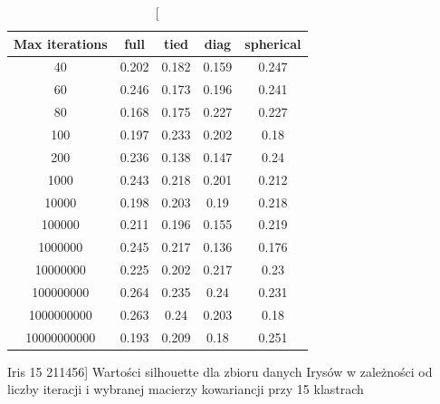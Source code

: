 \documentclass{classrep}
\begin{document}
{{            \begin{table}[!htbp]
                \begin{minipage}{1\textwidth}
                \centering
                \begin{tabular}{|c|c|c|c|c|}
                \hline
                Max iterations & full & tied & diag & spherical \\ \hline
                40 & 0.202 & 0.182 & 0.159 & 0.247 \\ \hline
                60 & 0.246 & 0.173 & 0.196 & 0.241 \\ \hline
                80 & 0.168 & 0.175 & 0.227 & 0.227 \\ \hline
                100 & 0.197 & 0.233 & 0.202 & 0.18 \\ \hline
                200 & 0.236 & 0.138 & 0.147 & 0.24 \\ \hline
                1000 & 0.243 & 0.218 & 0.201 & 0.212 \\ \hline
                10000 & 0.198 & 0.203 & 0.19 & 0.218 \\ \hline
                100000 & 0.211 & 0.196 & 0.155 & 0.219 \\ \hline
                1000000 & 0.245 & 0.217 & 0.136 & 0.176 \\ \hline
                10000000 & 0.225 & 0.202 & 0.217 & 0.23 \\ \hline
                100000000 & 0.264 & 0.235 & 0.24 & 0.231 \\ \hline
                1000000000 & 0.263 & 0.24 & 0.203 & 0.18 \\ \hline
                10000000000 & 0.193 & 0.209 & 0.18 & 0.251 \\ \hline
                \end{tabular}
                \caption
                [Iris 15 211456]
                {Wartości silhouette dla zbioru danych Irysów w zależności od liczby
                iteracji i wybranej macierzy kowariancji przy 15 klastrach}
                \label{Iris_15_211456}
                \end{minipage}
                \hfill            
            

\end{table}}}
\end{document}
